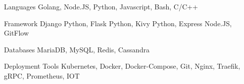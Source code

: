 


\begin{cvskills}


\cvskill
{Languages} %
{Golang, Node.JS, Python, Javascript, Bash, C/C++} %


\cvskill
{Framework} %
{Django Python, Flask Python, Kivy Python, Express Node.JS, GitFlow} %


\cvskill
{Databases} %
{MariaDB, MySQL, Redis, Cassandra} %


\cvskill
{Deployment Tools} %
{Kubernetes, Docker, Docker-Compose, Git, Nginx, Traefik, gRPC, Prometheus, IOT} %




\end{cvskills}